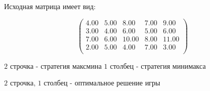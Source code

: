 \documentclass{article}
\begin{document}
Исходная матрица имеет вид: 

$$\begin{pmatrix}
4.00&5.00&8.00&7.00&9.00\\
3.00&4.00&6.00&5.00&6.00\\
7.00&6.00&10.00&8.00&11.00\\
2.00&5.00&4.00&7.00&3.00\\
\end{pmatrix}$$

$ 2 $ строчка  - стратегия максмина 
$ 1 $ столбец  - стратегия минимакса 

$ 2 $ строчка, 
$ 1 $ столбец  - оптимальное решение игры 
\end{document}
